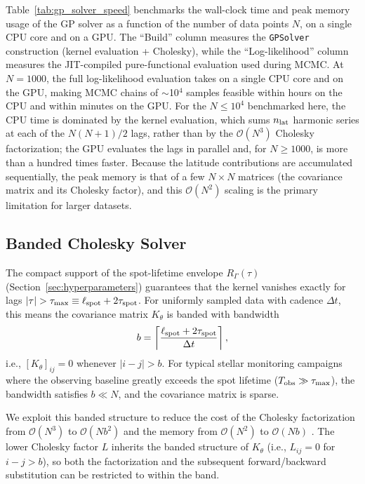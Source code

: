 \documentclass[preprint]{aastex702}
\begin{document}

Table~\ref{tab:gp_solver_speed} benchmarks the wall-clock time and peak memory usage of the GP solver as a function of the number of data points $N$, on a single CPU core and on a GPU. The ``Build'' column measures the \texttt{GPSolver} construction (kernel evaluation + Cholesky), while the ``Log-likelihood'' column measures the JIT-compiled pure-functional evaluation used during MCMC. At $N = 1000$, the full log-likelihood evaluation takes  on a single CPU core and  on the GPU, making MCMC chains of $\sim$10$^4$ samples feasible within hours on the CPU and within minutes on the GPU. For the $N \leq 10^4$ benchmarked here, the CPU time is dominated by the kernel evaluation, which sums $n_{\rm lat}$ harmonic series at each of the $N(N+1)/2$ lags, rather than by the $\mathcal{O}(N^3)$ Cholesky factorization; the GPU evaluates the lags in parallel and, for $N \geq 1000$, is more than a hundred times faster. Because the latitude contributions are accumulated sequentially, the peak memory is that of a few $N \times N$ matrices (the covariance matrix and its Cholesky factor), and this $\mathcal{O}(N^2)$ scaling is the primary limitation for larger datasets.

\subsection{Banded Cholesky Solver}

The compact support of the spot-lifetime envelope $R_\Gamma(\tau)$ (Section~\ref{sec:hyperparameters}) guarantees that the kernel vanishes exactly for lags $|\tau| > \tau_{\max} \equiv \ell_{\rm spot} + 2\tau_{\rm spot}$.  For uniformly sampled data with cadence $\Delta t$, this means the covariance matrix $K_\theta$ is banded with bandwidth
\begin{equation}
    b = \left\lceil \frac{\ell_{\rm spot} + 2\tau_{\rm spot}}{\Delta t} \right\rceil,
    \label{eq:bandwidth}
\end{equation}
i.e., $[K_\theta]_{ij} = 0$ whenever $|i - j| > b$.  For typical stellar monitoring campaigns where the observing baseline greatly exceeds the spot lifetime ($T_{\rm obs} \gg \tau_{\max}$), the bandwidth satisfies $b \ll N$, and the covariance matrix is sparse.

We exploit this banded structure to reduce the cost of the Cholesky factorization from $\mathcal{O}(N^3)$ to $\mathcal{O}(Nb^2)$ and the memory from $\mathcal{O}(N^2)$ to $\mathcal{O}(Nb)$ \citep[Section~4.3.5]{golub_matrix_2013}.  The lower Cholesky factor $L$ inherits the banded structure of $K_\theta$ (i.e., $L_{ij} = 0$ for $i - j > b$), so both the factorization and the subsequent forward/backward substitution can be restricted to within the band.
\end{document}
